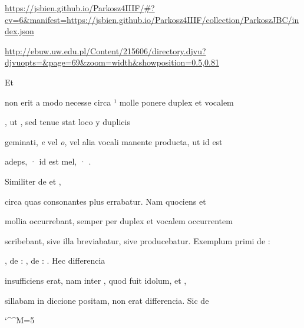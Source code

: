 
\newParkoszpage


{
\url{https://jsbien.github.io/Parkosz4IIIF/\#?cv=6&manifest=https://jsbien.github.io/Parkosz4IIIF/collection/ParkoszJBC/index.json}
  
\url{http://ebuw.uw.edu.pl/Content/215606/directory.djvu?djvuopts=&page=69&zoom=width&showposition=0.5,0.81}
}


\fullpreviouslines


{
\color{blue}
Et

}


\fulllines
{}
non erit a modo necesse circa ¹ molle ponere duplex  et vocalem 

, ut  , sed  tenue stat loco y duplicis

geminati, \textit{e} vel \textit{o}, vel alia vocali manente producta, ut  id est

\splitlines
adeps, ·  id est mel, · .

\indentK Similiter de  et ,

\fulllines
circa quas consonantes plus errabatur. Nam quociens  et 

mollia occurrebant, semper per duplex  et vocalem occurrentem

scribebant, sive illa breviabatur, sive producebatur. Exemplum primi de :

, de : , de : . Hec differencia

insufficiens erat, nam inter , quod fuit idolum, et ,

sillabam in diccione  positam, non erat differencia. Sic de

\catcode `\^^M=5


